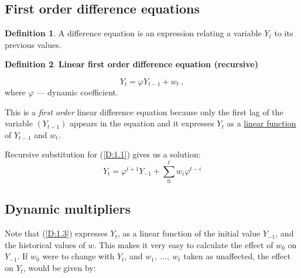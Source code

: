 \documentclass[12pt, english]{article}
\numberwithin{equation}{section} %
\theoremstyle{plain}
\theoremstyle{definition}
\newtheorem{definition}{Definition}[subsection]
\newtheorem{example}{Example}[subsection]
\begin{document}
\subsection{First order difference equations}
\begin{definition}
	A difference equation is an expression relating a variable $Y_t$ to its previous values.
\end{definition}

\begin{definition}
	\textbf{Linear first order difference equation (recursive)}
	
	\begin{equation}
		\tag{D 1.1}
		\label{D:1.1}
		Y_t = \varphi Y_{t-1} + w_t \ ,
	\end{equation}
	where $\varphi$ --- dynamic coefficient.
	
	This is a \textit{first order} linear difference equation because only the first lag of the variable $(Y_{t-1})$ appears in the equation and it expresses $Y_t$ as a \underline{linear function} of $Y_{t-1}$ and $w_t$.
\end{definition}

%	

Recursive substitution for (\ref{D:1.1}) gives us a solution:
\begin{equation}
	\tag{D 1.3}
	\label{D:1.3}
	Y_t = \varphi^{t+1} Y_{-1} + \sum\limits_0^t w_i \varphi^{t-i}
\end{equation}

\subsection*{Dynamic multipliers}

Note that (\ref{D:1.3}) expresses $Y_t$, as a linear function of the initial value $Y_{-1}$, and
the historical values of $w$. This makes it very easy to calculate the effect of $w_0$ on
$Y_{-1}$. If $w_0$ were to change with $Y_t$, and $w_1,\ \dots,\ w_t$ taken as unaffected, the
effect on $Y_t$, would be given by:
\end{document}
